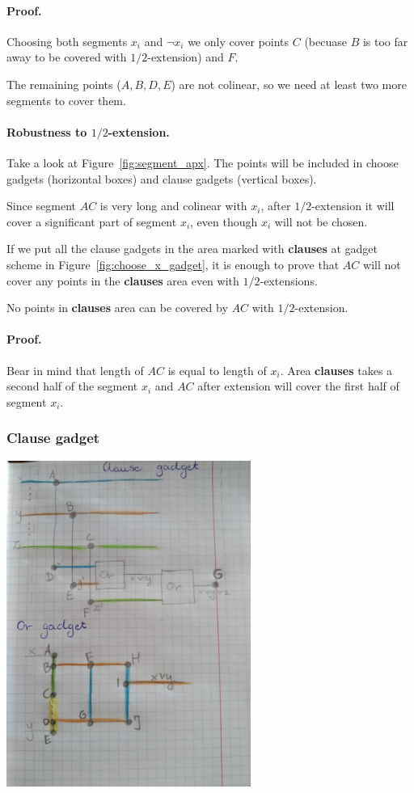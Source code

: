 \paragraph{Proof.}
Choosing both segments $x_i$ and $\neg x_i$
we only cover points $C$
(becuase $B$ is too far away to be covered with $1/2$-extension)
and $F$.

The remaining points ($A, B, D, E$) are not colinear,
so we need at least two more segments to cover them.

\paragraph{Robustness to $1/2$-extension.}
Take a look at Figure~\ref{fig:segment_apx}.
The points will be included in choose gadgets (horizontal boxes)
and clause gadgets (vertical boxes).

Since segment $AC$ is very long
and colinear with $x_i$, after $1/2$-extension
it will cover a significant part of segment $x_i$,
even though $x_i$ will not be chosen.

If we put all the clause gadgets in the area
marked with \textbf{clauses} at gadget scheme in Figure~\ref{fig:choose_x_gadget},
it is enough to prove that $AC$ will not cover any points
in the \textbf{clauses} area even with $1/2$-extensions.

\begin{lemma}
No points in \textbf{clauses} area can be covered
by $AC$ with $1/2$-extension.
\end{lemma}

\paragraph{Proof.}
Bear in mind that length of $AC$ is equal to length of $x_i$.
Area \textbf{clauses} takes a second half
of the segment $x_i$ and $AC$ after extension will cover the first
half of segment $x_i$.

\subsubsection{Clause gadget}
\includegraphics[width=0.6\textwidth]{clause_gadget.jpg}

